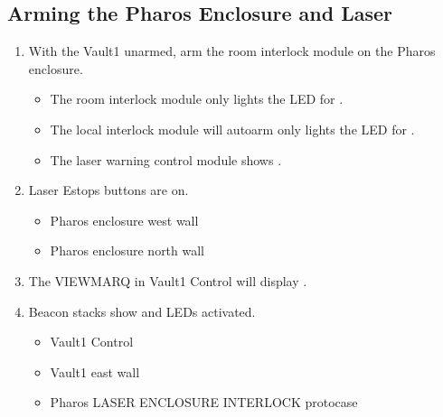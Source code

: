 \documentclass[letterpaper,10pt,english]{sphinxmanual}
\begin{document}
\subsection{Arming the Pharos Enclosure and Laser}
\label{\detokenize{testing_documentation/Vault-1_laser:arming-the-pharos-enclosure-and-laser}}\begin{enumerate}
%
\item {} 
\sphinxAtStartPar
With the Vault\sphinxhyphen{}1 unarmed, arm the room interlock module on the Pharos enclosure.
\begin{itemize}
\item {} 
\sphinxAtStartPar
The room interlock module only lights the LED for .

\item {} 
\sphinxAtStartPar
The local interlock module will auto\sphinxhyphen{}arm only lights the LED for .

\item {} 
\sphinxAtStartPar
The laser warning control module shows .

\end{itemize}

\item {} 
\sphinxAtStartPar
Laser E\sphinxhyphen{}stops buttons are on.
\begin{itemize}
\item {} 
\sphinxAtStartPar
Pharos enclosure west wall

\item {} 
\sphinxAtStartPar
Pharos enclosure north wall

\end{itemize}

\item {} 
\sphinxAtStartPar
The VIEWMARQ in Vault\sphinxhyphen{}1 Control will display  \sphinxhyphen{} .

\item {} 
\sphinxAtStartPar
Beacon stacks show  and  LEDs activated.
\begin{itemize}
\item {} 
\sphinxAtStartPar
Vault\sphinxhyphen{}1 Control

\item {} 
\sphinxAtStartPar
Vault\sphinxhyphen{}1 east wall

\item {} 
\sphinxAtStartPar
Pharos LASER ENCLOSURE INTERLOCK protocase


\end{itemize}
\end{enumerate}
\end{document}
